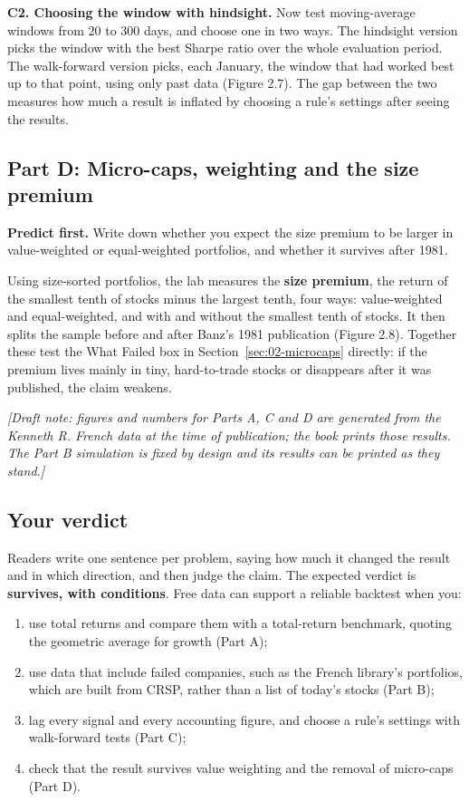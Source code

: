 \textbf{C2. Choosing the window with hindsight.} Now test moving-average windows
from 20 to 300 days, and choose one in two ways. The hindsight version picks the
window with the best Sharpe ratio over the whole evaluation period. The
walk-forward version picks, each January, the window that had worked best up to
that point, using only past data (Figure 2.7). The gap between the two measures
how much a result is inflated by choosing a rule's settings after seeing the
results.

\subsection*{Part D: Micro-caps, weighting and the size premium}

\textbf{Predict first.} Write down whether you expect the size premium to be
larger in value-weighted or equal-weighted portfolios, and whether it survives
after 1981.

Using size-sorted portfolios, the lab measures the \textbf{size premium}, the
return of the smallest tenth of stocks minus the largest tenth, four ways:
value-weighted and equal-weighted, and with and without the smallest tenth of
stocks. It then splits the sample before and after Banz's 1981 publication
(Figure 2.8). Together these test the What Failed box in
Section~\ref{sec:02-microcaps} directly: if the premium lives mainly in tiny,
hard-to-trade stocks or disappears after it was published, the claim weakens.

\emph{[Draft note: figures and numbers for Parts A, C and D are generated from the Kenneth R. French data at the time of publication; the book prints those results. The Part B simulation is fixed by design and its results can be printed as they stand.]}

\subsection*{Your verdict}

Readers write one sentence per problem, saying how much it changed the result and in which direction, and then judge the claim. The expected verdict is \textbf{survives, with conditions}. Free data can support a reliable backtest when you:

\begin{enumerate}
  \item use total returns and compare them with a total-return benchmark, quoting the geometric average for growth (Part A);
  \item use data that include failed companies, such as the French library's portfolios, which are built from CRSP, rather than a list of today's stocks (Part B);
  \item lag every signal and every accounting figure, and choose a rule's settings with walk-forward tests (Part C);
  \item check that the result survives value weighting and the removal of micro-caps (Part D).
\end{enumerate}

